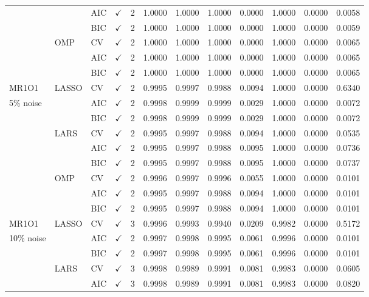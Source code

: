 \documentclass[11pt,a4paper]{article}
\begin{document}
{\begin{longtable}{@{}lllccccccccc@{}}
& & AIC & $\checkmark$ & 2 & 1.0000 & 1.0000 & 1.0000 & 0.0000 & 1.0000 & 0.0000 & 0.0058 \\
& & BIC & $\checkmark$ & 2 & 1.0000 & 1.0000 & 1.0000 & 0.0000 & 1.0000 & 0.0000 & 0.0059 \\
& OMP & CV & $\checkmark$ & 2 & 1.0000 & 1.0000 & 1.0000 & 0.0000 & 1.0000 & 0.0000 & 0.0065 \\
& & AIC & $\checkmark$ & 2 & 1.0000 & 1.0000 & 1.0000 & 0.0000 & 1.0000 & 0.0000 & 0.0065 \\
& & BIC & $\checkmark$ & 2 & 1.0000 & 1.0000 & 1.0000 & 0.0000 & 1.0000 & 0.0000 & 0.0065 \\ \midrule
MR1O1 & LASSO & CV & $\checkmark$ & 2 & 0.9995 & 0.9997 & 0.9988 & 0.0094 & 1.0000 & 0.0000 & 0.6340 \\
5\% noise & & AIC & $\checkmark$ & 2 & 0.9998 & 0.9999 & 0.9999 & 0.0029 & 1.0000 & 0.0000 & 0.0072 \\
& & BIC & $\checkmark$ & 2 & 0.9998 & 0.9999 & 0.9999 & 0.0029 & 1.0000 & 0.0000 & 0.0072 \\
& LARS & CV & $\checkmark$ & 2 & 0.9995 & 0.9997 & 0.9988 & 0.0094 & 1.0000 & 0.0000 & 0.0535 \\
& & AIC & $\checkmark$ & 2 & 0.9995 & 0.9997 & 0.9988 & 0.0095 & 1.0000 & 0.0000 & 0.0736 \\
& & BIC & $\checkmark$ & 2 & 0.9995 & 0.9997 & 0.9988 & 0.0095 & 1.0000 & 0.0000 & 0.0737 \\
& OMP & CV & $\checkmark$ & 2 & 0.9996 & 0.9997 & 0.9996 & 0.0055 & 1.0000 & 0.0000 & 0.0101 \\
& & AIC & $\checkmark$ & 2 & 0.9995 & 0.9997 & 0.9988 & 0.0094 & 1.0000 & 0.0000 & 0.0101 \\
& & BIC & $\checkmark$ & 2 & 0.9995 & 0.9997 & 0.9988 & 0.0094 & 1.0000 & 0.0000 & 0.0101 \\ \midrule
MR1O1 & LASSO & CV & $\checkmark$ & 3 & 0.9996 & 0.9993 & 0.9940 & 0.0209 & 0.9982 & 0.0000 & 0.5172 \\
10\% noise & & AIC & $\checkmark$ & 2 & 0.9997 & 0.9998 & 0.9995 & 0.0061 & 0.9996 & 0.0000 & 0.0101 \\
& & BIC & $\checkmark$ & 2 & 0.9997 & 0.9998 & 0.9995 & 0.0061 & 0.9996 & 0.0000 & 0.0101 \\
& LARS & CV & $\checkmark$ & 3 & 0.9998 & 0.9989 & 0.9991 & 0.0081 & 0.9983 & 0.0000 & 0.0605 \\
& & AIC & $\checkmark$ & 3 & 0.9998 & 0.9989 & 0.9991 & 0.0081 & 0.9983 & 0.0000 & 0.0820 \\

\end{longtable}}
\end{document}
